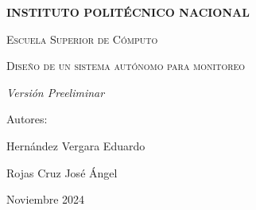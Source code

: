 \begin{titlepage}
\begin{figure}[ht!]
\begin{minipage}{0.2\textwidth}
        \end{minipage}
    \end{figure}
    \centering
    \vspace{1cm}
    {\bfseries\LARGE INSTITUTO POLIT\'ECNICO NACIONAL \par}
    \vspace{1cm}
    {\scshape\Large Escuela Superior de C\'omputo \par}
    \vspace{3cm}
    {\scshape\Huge Dise\~no de un sistema aut\'onomo para monitoreo \par}
    \vspace{3cm}
    {\itshape\Large Versi\'on Preeliminar \par}
    \vfill
    {\Large Autores: \par}
    {\Large Hern\'andez Vergara Eduardo \par}
    {\Large Rojas Cruz Jos\'e \'Angel \par}
    \vfill
    {\Large Noviembre 2024 \par}
\end{titlepage}